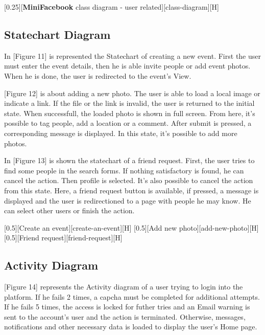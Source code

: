 \documentclass{article}
\begin{document}
			[0.25][\textbf{MiniFacebook} class diagram - user related][class-diagram][H]

		\subsection{Statechart Diagram}
			In [Figure 11] is represented the Statechart of creating a new event. First the user must enter the event details, then he is able invite people or add event photos. When he is done, the user is redirected to the event's View.

			\bigskip
			[Figure 12] is about adding a new photo. The user is able to load a local image or indicate a link. If the file or the link is invalid, the user is returned to the initial state. When successfull, the loaded photo is shown in full screen. From here, it's possible to tag people, add a location or a comment. After submit is pressed, a corresponding message is displayed. In this state, it's possible to add more photos.
			
			\bigskip
			In [Figure 13] is shown the statechart of a friend request. First, the user tries to find some people in the search forms. If nothing satisfactory is found, he can cancel the action. Then profile is selected. It's also possible to cancel the action from this state. Here, a friend request button is available, if pressed, a message is displayed and the user is redirectioned to a page with people he may know. He can select other users or finish the action.

			[0.5][Create an event][create-an-event][H]
			[0.5][Add new photo][add-new-photo][H]
			[0.5][Friend request][friend-request][H]

		\subsection{Activity Diagram}
			[Figure 14] represents the Activity diagram of a user trying to login into the platform. If he fails 2 times, a capcha must be completed for additional attempts. If he fails 5 times, the access is locked for futher tries and an Email warning is sent to the account's user and the action is terminated. Otherwise, messages, notifications and other necessary data is loaded to display the user's Home page.
\end{document}
